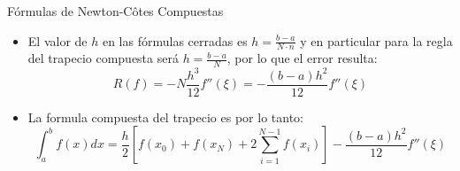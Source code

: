 \documentclass[12pt]{beamer}
\begin{document}
\begin{frame}{F\'ormulas de Newton-C\^otes Compuestas}
  \begin{itemize}
    \item El valor de $h$ en las fórmulas cerradas es $h=\frac{b-a}{N\cdot n}$ y en particular para la regla del trapecio compuesta será $h=\frac{b-a}{N}$, por lo que el error resulta:
    $$
    R(f) = -N\dfrac{h^3}{12}f''(\xi)=-\dfrac{(b-a)h^2}{12}f''(\xi)
    $$
    \item<2-> La formula compuesta del trapecio es por lo tanto:
    $$
      \int_{a}^{b}f(x)dx = \dfrac{h}{2}\left[f(x_0)+f(x_N)+2\sum_{i=1}^{N-1}f(x_i)\right]- \dfrac{(b-a)h^2}{12}f''(\xi)
    $$
  \end{itemize}
\end{frame}
\end{document}
